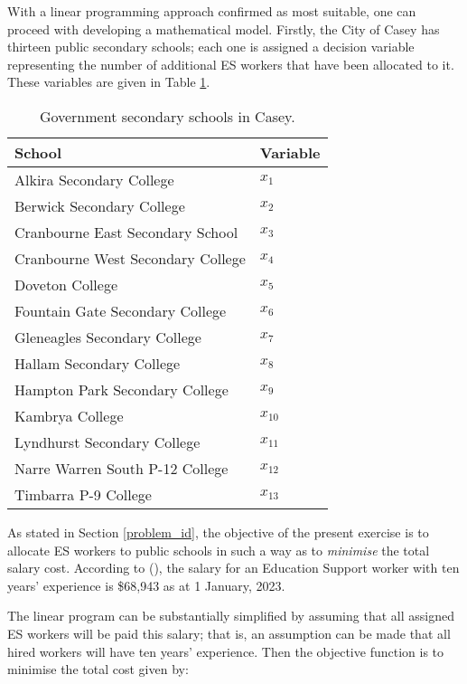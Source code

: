 \documentclass[11pt, a4paper]{article}
\begin{document}
    With a linear programming approach confirmed as most suitable, one can proceed with developing a mathematical model. Firstly, the City of Casey has thirteen public secondary schools; each one is assigned a decision variable representing the number of additional ES workers that have been allocated to it. These variables are given in Table \ref{dec_vars}.

    \begin{table}[!ht]
        \centering
        \caption{Government secondary schools in Casey.}
        \begin{tabular}{|l|l|}
            \hline
            School & Variable \\ \hline
            Alkira Secondary College & $x_1$ \\ \hline
            Berwick Secondary College & $x_2$ \\ \hline
            Cranbourne East Secondary School & $x_3$ \\ \hline
            Cranbourne West Secondary College & $x_4$ \\ \hline
            Doveton College & $x_5$ \\ \hline
            Fountain Gate Secondary College & $x_6$ \\ \hline
            Gleneagles Secondary College & $x_7$ \\ \hline
            Hallam Secondary College & $x_8$ \\ \hline
            Hampton Park Secondary College & $x_9$ \\ \hline
            Kambrya College & $x_{10}$ \\ \hline
            Lyndhurst Secondary College & $x_{11}$ \\ \hline
            Narre Warren South P-12 College & $x_{12}$ \\ \hline
            Timbarra P-9 College & $x_{13}$ \\ \hline
        \end{tabular}
        \label{dec_vars}
    \end{table}
    
    As stated in Section \ref{problem_id}, the objective of the present exercise is to allocate ES workers to public schools in such a way as to \textit{minimise} the total salary cost. According to  (), the salary for an Education Support worker with ten years' experience is \$68,943 as at 1 January, 2023.

    The linear program can be substantially simplified by assuming that all assigned ES workers will be paid this salary; that is, an assumption can be made that all hired workers will have ten years' experience. Then the objective function is to minimise the total cost given by:
\end{document}
